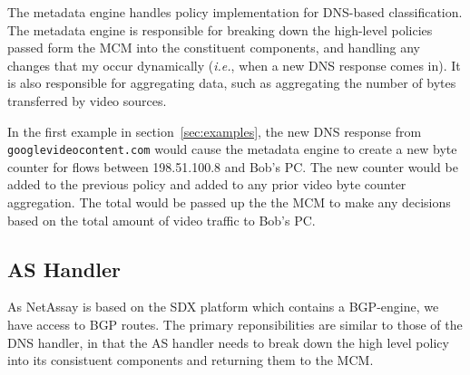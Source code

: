 \documentclass{sig-alternate}
\newcommand{\ie}{{\em i.e.}}
\newcommand\tti[1]{\small\texttt{#1}\normalsize}
\newcommand\system{NetAssay}
\begin{document}
The metadata engine handles policy implementation for DNS-based classification. The metadata engine is responsible for breaking down the high-level policies passed form the MCM into the constituent components, and handling any changes that my occur dynamically (\ie{}, when a new DNS response comes in). It is also responsible for aggregating data, such as aggregating the number of bytes transferred by video sources.


In the first example in section~\ref{sec:examples}, the new DNS response from \tti{googlevideocontent.com} would cause the metadata engine to create a new byte counter for flows between 198.51.100.8 and Bob's PC. The new counter would be added to the previous policy and added to any prior video byte counter aggregation. The total would be passed up the the MCM to make any decisions based on the total amount of video traffic to Bob's PC.



\subsection{AS Handler}
As \system{} is based on the SDX platform which contains a BGP-engine, we have access to BGP routes. The primary reponsibilities are similar to those of the DNS handler, in that the AS handler needs to break down the high level policy into its consistuent components and returning them to the MCM.
\end{document}
